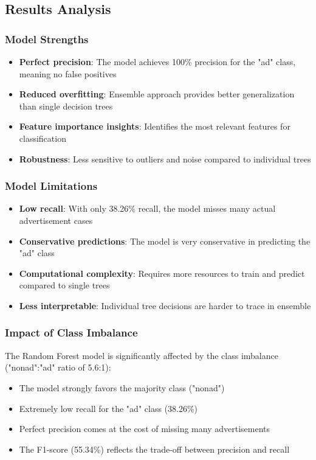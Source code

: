 \subsection{Results Analysis}

\subsubsection{Model Strengths}

\begin{itemize}
    \item \textbf{Perfect precision}: The model achieves 100\% precision for the "ad" class, meaning no false positives
    \item \textbf{Reduced overfitting}: Ensemble approach provides better generalization than single decision trees
    \item \textbf{Feature importance insights}: Identifies the most relevant features for classification
    \item \textbf{Robustness}: Less sensitive to outliers and noise compared to individual trees
\end{itemize}

\subsubsection{Model Limitations}

\begin{itemize}
    \item \textbf{Low recall}: With only 38.26\% recall, the model misses many actual advertisement cases
    \item \textbf{Conservative predictions}: The model is very conservative in predicting the "ad" class
    \item \textbf{Computational complexity}: Requires more resources to train and predict compared to single trees
    \item \textbf{Less interpretable}: Individual tree decisions are harder to trace in ensemble
\end{itemize}

\subsubsection{Impact of Class Imbalance}

The Random Forest model is significantly affected by the class imbalance ("nonad":"ad" ratio of 5.6:1):

\begin{itemize}
    \item The model strongly favors the majority class ("nonad")
    \item Extremely low recall for the "ad" class (38.26\%)
    \item Perfect precision comes at the cost of missing many advertisements
    \item The F1-score (55.34\%) reflects the trade-off between precision and recall
\end{itemize}

